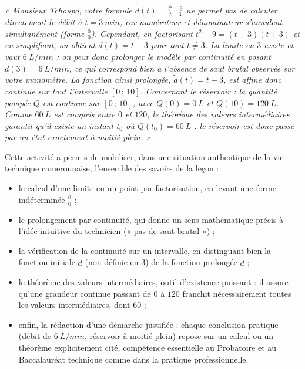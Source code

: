 \documentclass[11pt]{article}
\newcommand{\cle}[1]{{\popxbold\color{popdark}#1}}
\newcounter{popsec}
\newcounter{popsub}
\newcommand{\courssub}[1]{%
  \stepcounter{popsub}%
  \par\vspace{9pt}\noindent{\popxbold\fontsize{11.5}{13}\selectfont\color{popink}{\color{poporange}\thepopsec.\thepopsub}\hspace{6pt}#1}\par\nopagebreak\vspace{4pt}
}
\begin{document}
\begin{exoresolu}
\emph{« Monsieur Tchoupo, votre formule $d(t) = \frac{t^2-9}{t-3}$ ne permet pas de calculer directement le débit à $t = \SI{3}{min}$, car numérateur et dénominateur s'annulent simultanément (forme $\frac{0}{0}$). Cependant, en factorisant $t^2 - 9 = (t-3)(t+3)$ et en simplifiant, on obtient $d(t) = t + 3$ pour tout $t \neq 3$. La limite en $3$ existe et vaut $\SI{6}{L/min}$ : on peut donc prolonger le modèle par continuité en posant $d(3) = \SI{6}{L/min}$, ce qui correspond bien à l'absence de saut brutal observée sur votre manomètre. La fonction ainsi prolongée, $\tilde{d}(t) = t + 3$, est affine donc continue sur tout l'intervalle $[0\,;\,10]$. Concernant le réservoir : la quantité pompée $Q$ est continue sur $[0\,;\,10]$, avec $Q(0) = \SI{0}{L}$ et $Q(10) = \SI{120}{L}$. Comme $\SI{60}{L}$ est compris entre $0$ et $120$, le théorème des valeurs intermédiaires garantit qu'il existe un instant $t_0$ où $Q(t_0) = \SI{60}{L}$ : le réservoir est donc passé par un état exactement à moitié plein. »}
\end{exoresolu}

\courssub{Bilan de l'activité}

Cette activité a permis de mobiliser, dans une situation authentique de la vie technique camerounaise, l'ensemble des savoirs de la leçon :
\begin{itemize}
\item le calcul d'une \cle{limite} en un point par factorisation, en levant une forme indéterminée $\frac{0}{0}$ ;
\item le \cle{prolongement par continuité}, qui donne un sens mathématique précis à l'idée intuitive du technicien (« pas de saut brutal ») ;
\item la vérification de la \cle{continuité sur un intervalle}, en distinguant bien la fonction initiale $d$ (non définie en 3) de la fonction prolongée $\tilde{d}$ ;
\item le \cle{théorème des valeurs intermédiaires}, outil d'existence puissant : il assure qu'une grandeur continue passant de $0$ à $120$ franchit nécessairement toutes les valeurs intermédiaires, dont $60$ ;
\item enfin, la \cle{rédaction d'une démarche justifiée} : chaque conclusion pratique (débit de $\SI{6}{L/min}$, réservoir à moitié plein) repose sur un calcul ou un théorème explicitement cité, compétence essentielle au Probatoire et au Baccalauréat technique comme dans la pratique professionnelle.
\end{itemize}
\end{document}
